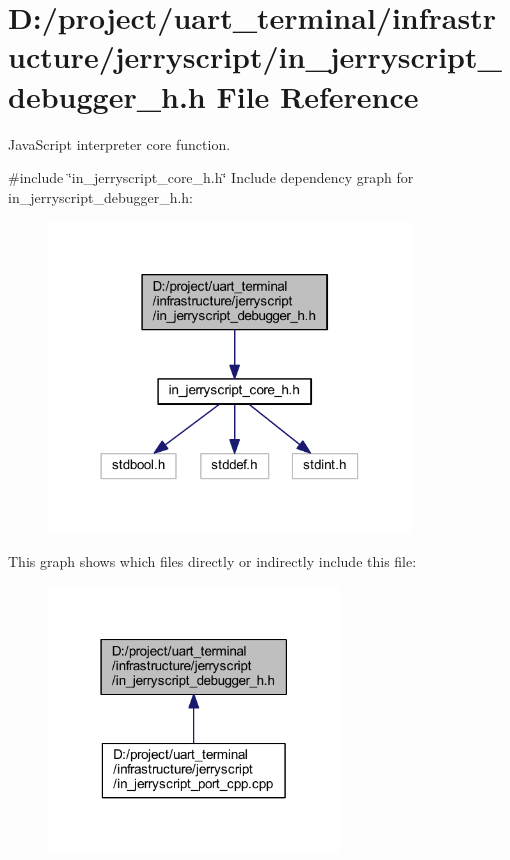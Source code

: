 \section{D\+:/project/uart\+\_\+terminal/infrastructure/jerryscript/in\+\_\+jerryscript\+\_\+debugger\+\_\+h.h File Reference}
\label{in__jerryscript__debugger__h_8h}


Java\+Script interpreter core function.  


{\ttfamily \#include \char`\"{}in\+\_\+jerryscript\+\_\+core\+\_\+h.\+h\char`\"{}}\newline
Include dependency graph for in\+\_\+jerryscript\+\_\+debugger\+\_\+h.\+h\+:\nopagebreak
\begin{figure}[H]
\begin{center}
\leavevmode
\includegraphics[width=273pt]{in__jerryscript__debugger__h_8h__incl}
\end{center}
\end{figure}
This graph shows which files directly or indirectly include this file\+:\nopagebreak
\begin{figure}[H]
\begin{center}
\leavevmode
\includegraphics[width=219pt]{in__jerryscript__debugger__h_8h__dep__incl}
\end{center}
\end{figure}
